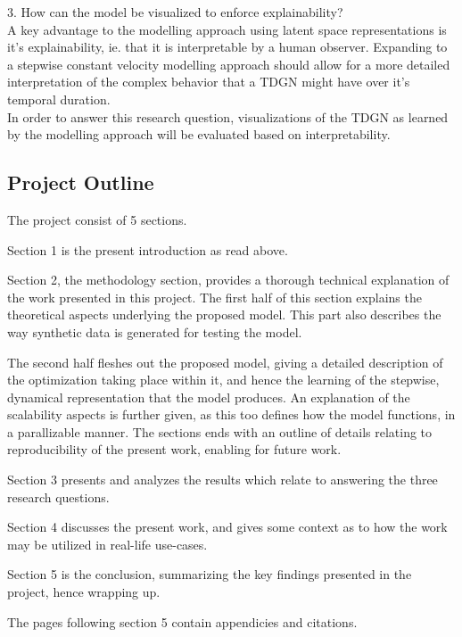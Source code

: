 \hspace*{5mm} 3. How can the model be visualized to enforce explainability?
\\
A key advantage to the modelling approach using latent space representations is it's explainability, ie. that it is interpretable by a human observer.
Expanding to a stepwise constant velocity modelling approach should allow for a more detailed interpretation of the complex behavior that a TDGN might have over it's temporal duration.
\\
In order to answer this research question, visualizations of the TDGN as learned by the modelling approach will be evaluated based on interpretability. 



\subsection{Project Outline}
\label{sec:Intro:ThesisOutline}
The project consist of 5 sections.

Section 1 is the present introduction as read above.

Section 2, the methodology section, provides a thorough technical explanation of the work presented in this project.
The first half of this section explains the theoretical aspects underlying the proposed model.
This part also describes the way synthetic data is generated for testing the model.


The second half fleshes out the proposed model, giving a detailed description of the optimization taking place within it, and hence the learning of the stepwise, dynamical representation that the model produces.
An explanation of the scalability aspects is further given, as this too defines how the model functions, in a parallizable manner.
The sections ends with an outline of details relating to reproducibility of the present work, enabling for future work.

Section 3 presents and analyzes the results which relate to answering the three research questions.

Section 4 discusses the present work, and gives some context as to how the work may be utilized in real-life use-cases.

Section 5 is the conclusion, summarizing the key findings presented in the project, hence wrapping up.

The pages following section 5 contain appendicies and citations.






